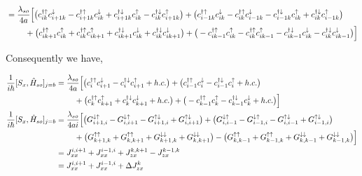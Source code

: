 \documentclass[10pt,prb,showpacs,amssymb,floatfix]{revtex4-1}
\newcommand{\dg}{\dagger}
\newcommand{\dna}{\downarrow}
\newcommand{\nn}{\nonumber}
\newcommand{\upa}{\uparrow}
\newcommand{\Dlt}{\Delta}
\newcommand{\h}{\hat}
\begin{document}
\begin{align}
&=  \frac{\lambda_{so}}{4a} \Big{[}       \big{(}    c_{ik}^{\dg\upa} c_{i+1k}^\downarrow -  c_{i+1k}^{\dagger \uparrow} c_{i k}^\dna + c_{i+1k}^{\dagger \downarrow} c_{ik}^\upa  -  c_{ik}^{\dg\dna} c_{i+1 k}^\uparrow \big{)} 
+   \big{(}       c_{i-1 k}^{\dagger \uparrow} c_{i k}^\dna -  c_{ik}^{\dg\upa}  c_{i-1 k}^\downarrow -  c_{i-1 k}^{\dagger \downarrow} c_{ik}^\upa  + c_{ik}^{\dg\dna}  c_{i-1 k}^\uparrow      \big{)} \nn\\
& ~~~~~~~ +  \big{(}   c_{ik+1}^{\dagger \uparrow}  c_{ik}^\upa + c_{ik}^{\dg\upa}  c_{i k+1}^\upa  + c_{i k+1}^{\dagger \downarrow} c_{i k}^\dna  + c_{ik}^{\dg\dna} c_{i k+1}^\dna  \big{)}  
+  \big{(}   -    c_{i k-1}^{\dagger \upa}  c_{ik}^\upa     -  c_{ik}^{\dg\upa} c_{i k-1}^\uparrow   -  c_{i k-1}^{\dagger \dna}  c_{ik}^\dna   -   c_{ik}^{\dg\dna} c_{ik-1}^\downarrow  \big{)}  \Big{]}
\end{align}

Consequently we have,

\begin{align}
\frac{1}{i\hbar}[S_x, \h H_{so}]_{j=b} &=\frac{\lambda_{so}}{4a} \Big{[}       \big{(}    c_{i}^{\dg\upa} c_{i+1}^\downarrow  -  c_{i}^{\dg\dna} c_{i+1 }^\uparrow + h.c. \big{)} 
+   \big{(}       c_{i-1}^{\dagger \uparrow} c_{i}^\dna  -  c_{i-1 }^{\dagger \downarrow} c_{i}^\upa  + h.c.      \big{)} \nn\\
& ~~~~~~~ +  \big{(}    c_{k}^{\dg\upa}  c_{ k+1}^\upa   + c_{k}^{\dg\dna} c_{ k+1}^\dna + h.c. \big{)}  
+  \big{(}   -    c_{ k-1}^{\dagger \upa}  c_{k}^\upa    -  c_{ k-1}^{\dagger \dna}  c_{k}^\dna  + h.c.  \big{)}  \Big{]} \nn\\
\frac{1}{i\hbar}[S_x, \h H_{so}]_{j=b} &=\frac{\lambda_{so}}{4ai} \Big{[}       \big{(}   G_{i+1,i}^{\dna\upa}  -  G_{i,i+1}^{\dna\upa}    -  G_{i+1,i}^{\upa\dna} + G_{i,i+1}^{\upa\dna}   \big{)} 
+   \big{(}    G_{i,i-1}^{\dna\upa}   -  G_{i-1,i}^{\dna\upa}  -  G_{i,i-1}^{\upa\dna}   + G_{i-1,i}^{\upa\dna}      \big{)} \nn\\
& ~~~~~~~ +  \big{(}   G_{k+1,k}^{\upa\upa} + G_{k,k+1}^{\upa\upa} + G_{k+1,k}^{\dna\dna}  + G_{k,k+1}^{\dna\dna}      \big{)}  
-  \big{(}     G_{k,k-1}^{\upa\upa}    + G_{k-1,k}^{\upa\upa}    + G_{k,k-1}^{\dna\dna}    +  G_{k-1,k}^{\dna\dna}   \big{)}  \Big{]} \nn\\
&= J_{xx}^{i,i+1} + J_{xx}^{i-1,i}  + J_{zx}^{k,k+1} - J_{zx}^{k-1,k} \nn\\
&= J_{xx}^{i,i+1} + J_{xx}^{i-1,i} + \Dlt J_{zx}^{k}
\end{align}
\end{document}
